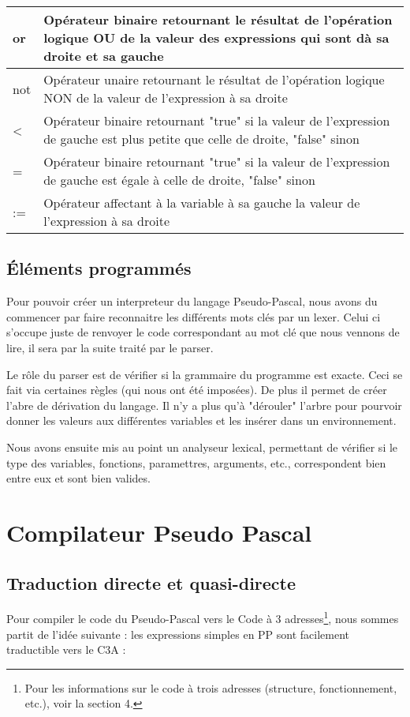 \documentclass{article}
\begin{document}
\begin{tabular}{|p{2cm}|p{11cm}|}
  or & Opérateur binaire retournant le résultat de l'opération logique OU de la valeur des expressions qui sont dà sa droite et sa gauche\\ \hline
  not & Opérateur unaire retournant le résultat de l'opération logique NON de la valeur de l'expression à sa droite \\ \hline
  < & Opérateur binaire retournant "true" si la valeur de l'expression de gauche est plus petite que celle de droite, "false" sinon\\ \hline
  = & Opérateur binaire retournant "true" si la valeur de l'expression de gauche est égale à celle de droite, "false" sinon\\ \hline
  := & Opérateur affectant à la variable à sa gauche la valeur de l'expression à sa droite \\ \hline
\end{tabular}



\subsection{Éléments programmés}

Pour pouvoir créer un interpreteur du langage Pseudo-Pascal, nous avons du commencer par faire reconnaitre les différents mots clés par un lexer. Celui ci s'occupe juste de renvoyer le code correspondant au mot clé que nous vennons de lire, il sera par la suite traité par le parser.

\smallbreak
Le rôle du parser est de vérifier si la grammaire du programme est exacte. Ceci se fait via certaines règles (qui nous ont été imposées). De plus il permet de créer l'abre de dérivation du langage. Il n'y a plus qu'à "dérouler" l'arbre pour pourvoir donner les valeurs aux différentes variables et les insérer dans un environnement.

\smallbreak
Nous avons ensuite mis au point un analyseur lexical, permettant de vérifier si le type des variables, fonctions, paramettres, arguments, etc., correspondent bien entre eux et sont bien valides.

\newpage
\section{Compilateur Pseudo Pascal}

\subsection{Traduction directe et quasi-directe}
Pour compiler le code du Pseudo-Pascal vers le Code à 3 adresses\footnote{Pour les informations sur le code à trois adresses (structure, fonctionnement, etc.), voir la section 4.}, nous sommes partit de l'idée suivante : les expressions simples en PP sont facilement traductible vers le C3A :
\end{document}
